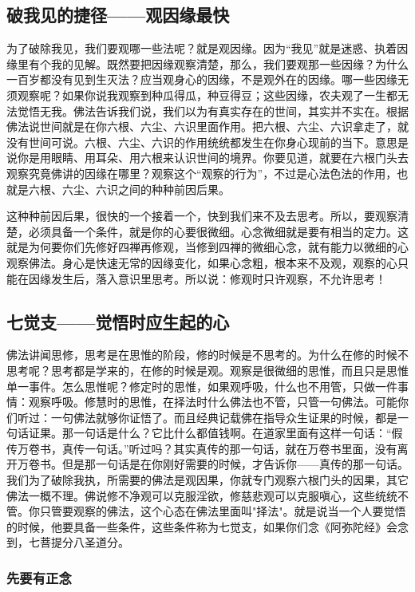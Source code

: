 \documentclass{book}
\begin{document}
\subsection{破我见的捷径——观因缘最快}

为了破除我见，我们要观哪一些法呢？就是观因缘。因为``我见''就是迷惑、执着因缘里有个我的见解。既然要把因缘观察清楚，那么，我们要观那一些因缘？为什么一百岁都没有见到生灭法？应当观身心的因缘，不是观外在的因缘。哪一些因缘无须观察呢？如果你说我观察到种瓜得瓜，种豆得豆；这些因缘，农夫观了一生都无法觉悟无我。佛法告诉我们说，我们以为有真实存在的世间，其实并不实在。根据佛法说世间就是在你六根、六尘、六识里面作用。把六根、六尘、六识拿走了，就没有世间可说。六根、六尘、六识的作用统统都发生在你身心现前的当下。意思是说你是用眼睛、用耳朵、用六根来认识世间的境界。你要见道，就要在六根门头去观察究竟佛讲的因缘在哪里？观察这个``观察的行为''，不过是心法色法的作用，也就是六根、六尘、六识之间的种种前因后果。

这种种前因后果，很快的一个接着一个，快到我们来不及去思考。所以，要观察清楚，必须具备一个条件，就是你的心要很微细。心念微细就是要有相当的定力。这就是为何要你们先修好四禅再修观，当修到四禅的微细心念，就有能力以微细的心观察佛法。身心是快速无常的因缘变化，如果心念粗，根本来不及观，观察的心只能在因缘发生后，落入意识里思考。所以说：修观时只许观察，不允许思考！

\subsection{七觉支——觉悟时应生起的心}

佛法讲闻思修，思考是在思惟的阶段，修的时候是不思考的。为什么在修的时候不思考呢？思考都是学来的，在修的时候是观。观察是很微细的思惟，而且只是思惟单一事件。怎么思惟呢？修定时的思惟，如果观呼吸，什么也不用管，只做一件事情：观察呼吸。修慧时的思惟，在择法时什么佛法也不管，只管一句佛法。可能你们听过：一句佛法就够你证悟了。而且经典记载佛在指导众生证果的时候，都是一句话证果。那一句话是什么？它比什么都值钱啊。在道家里面有这样一句话：``假传万卷书，真传一句话。''听过吗？其实真传的那一句话，就在万卷书里面，没有离开万卷书。但是那一句话是在你刚好需要的时候，才告诉你——真传的那一句话。我们为了破除我执，所需要的佛法是观因果，你就专门观察六根门头的因果，其它佛法一概不理。佛说修不净观可以克服淫欲，修慈悲观可以克服嗔心，这些统统不管。你只管要观察的佛法，这个心态在佛法里面叫"择法"。就是说当一个人要觉悟的时候，他要具备一些条件，这些条件称为七觉支，如果你们念《阿弥陀经》会念到，七菩提分八圣道分。

\subsubsection{先要有正念}
\end{document}
